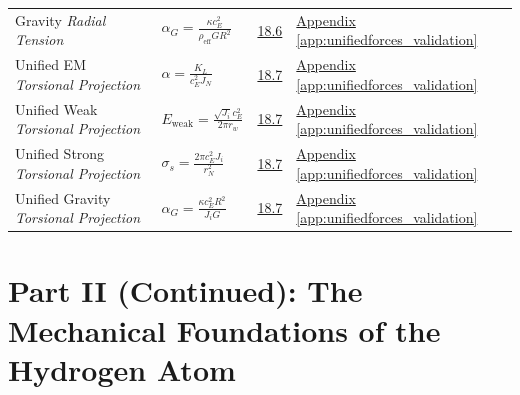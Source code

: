 \begin{longtable}{@{} p{4.5cm} p{6cm} c p{4cm} @{}}
Gravity \newline \textit{Radial Tension} & $\alpha_G = \frac{\kappa c_E^2}{\rho_{\text{eff}} G R^2}$ & \hyperref[sec:18.6]{18.6} & \hyperref[app:unifiedforces_validation]{Appendix \ref*{app:unifiedforces_validation}} \\

Unified EM \newline \textit{Torsional Projection} & $\alpha = \frac{K_L}{c_E^2 J_N}$ & \hyperref[sec:18.7]{18.7} & \hyperref[app:unifiedforces_validation]{Appendix \ref*{app:unifiedforces_validation}} \\

Unified Weak \newline \textit{Torsional Projection} & $E_{\text{weak}} = \frac{\sqrt{J_i} c_E^2}{2\pi r_w}$ & \hyperref[sec:18.7]{18.7} & \hyperref[app:unifiedforces_validation]{Appendix \ref*{app:unifiedforces_validation}} \\

Unified Strong \newline \textit{Torsional Projection} & $\sigma_s = \frac{2\pi c_E^2 J_i}{r_N^2}$ & \hyperref[sec:18.7]{18.7} & \hyperref[app:unifiedforces_validation]{Appendix \ref*{app:unifiedforces_validation}} \\

Unified Gravity \newline \textit{Torsional Projection} & $\alpha_G = \frac{\kappa c_E^2 R^2}{J_i G}$ & \hyperref[sec:18.7]{18.7} & \hyperref[app:unifiedforces_validation]{Appendix \ref*{app:unifiedforces_validation}} \\

\bottomrule
\end{longtable}

\newpage %

\section*{Part II (Continued): The Mechanical Foundations of the Hydrogen Atom}

